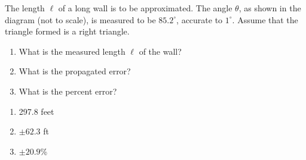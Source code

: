 {\label{exer:04_04_ex_35} The length $\ell$ of a long wall is to be approximated. The angle $\theta$, as shown in the diagram (not to scale), is measured to be $85.2^\circ$, accurate to $1^\circ$. Assume that the triangle formed is a right triangle.

\begin{minipage}{\linewidth}
\centering
{}
\end{minipage}

\begin{enumerate}
\item		What is the measured length $\ell$ of the wall?
\item		What is the propagated error? 
\item		What is the percent error?
\end{enumerate}
}
{\begin{enumerate}
\item		297.8 feet
\item		$\pm 62.3$ ft
\item		$\pm 20.9$\% 
\end{enumerate}
}

